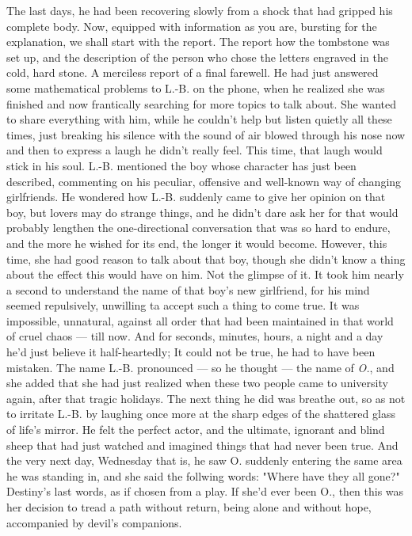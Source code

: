 The last days, he had been recovering slowly from a shock that had gripped his complete body. Now, equipped with information as you are, bursting for the explanation, we shall start with the report. The report how the tombstone was set up, and the description of the person who chose the letters engraved in the cold, hard stone. A merciless report of a final farewell. 
He had just answered some mathematical problems to L.-B. on the phone, when he realized she was finished and now frantically searching for more topics to talk about. She wanted to share everything with him, while he couldn't help but listen quietly all these times, just breaking his silence with the sound of air blowed through his nose now and then to express a laugh he didn't really feel. 
This time, that laugh would stick in his soul. L.-B. mentioned the boy whose character has just been described, commenting on his peculiar, offensive and well-known way of changing girlfriends. He wondered how L.-B. suddenly came to give her opinion on that boy, but lovers may do strange things, and he didn't dare ask her for that would probably lengthen the one-directional conversation that was so hard to endure, and the more he wished for its end, the longer it would become. 
However, this time, she had good reason to talk about that boy, though she didn't know a thing about the effect this would have on him. Not the glimpse of it. 
It took him nearly a second to understand the name of that boy's new girlfriend, for his mind seemed repulsively, unwilling ta accept such a thing to come true. 
It was impossible, unnatural, against all order that had been maintained in that world of cruel chaos --- till now. 
And for seconds, minutes, hours, a night and a day he'd just believe it half-heartedly; It could not be true, he had to have been mistaken. 
The name L.-B. pronounced --- so he thought --- the name of \emph{O.}, and she added that she had just realized when these two people came to university again, after that tragic holidays. 
The next thing he did was breathe out, so as not to irritate L.-B. by laughing once more at the sharp edges of the shattered glass of life's mirror. 
He felt the perfect actor, and the ultimate, ignorant and blind sheep that had just watched and imagined things that had never been true. And the very next day, Wednesday that is, he saw O. suddenly entering the same area he was standing in, and she said the follwing words: 
"Where have they all gone?" 
Destiny's last words, as if chosen from a play. If she'd ever been O., then this was her decision to tread a path without return, being alone and without hope, accompanied by devil's companions. 
